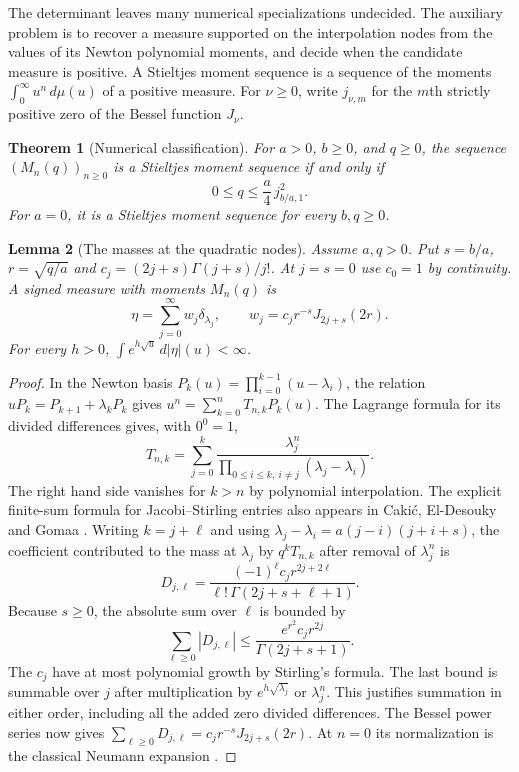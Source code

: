 \documentclass[11pt]{article}
\theoremstyle{plain}\newtheorem{theorem}{Theorem}[section]\newtheorem{lemma}[theorem]{Lemma}\newtheorem{corollary}[theorem]{Corollary}\newtheorem{proposition}[theorem]{Proposition}
\numberwithin{equation}{section}
\begin{document}
The determinant leaves many numerical specializations undecided.
The auxiliary problem is to recover a measure supported on the
interpolation nodes from the values of its Newton polynomial moments,
and decide when the candidate measure is positive.
A Stieltjes moment sequence is a sequence of the moments
$\int_0^\infty u^n\,d\mu(u)$ of a positive measure.
For $\nu\geq0$, write $j_{\nu,m}$ for the $m$th strictly positive
zero of the Bessel function $J_\nu$.

\begin{theorem}[Numerical classification]\label{thm:js-range}
For $a>0$, $b\geq0$, and $q\geq0$, the sequence $(M_n(q))_{n\geq0}$ is
a Stieltjes moment sequence if and only if
\[
      0\leq q\leq \frac a4\,j_{b/a,1}^2.
\]
For $a=0$, it is a Stieltjes moment sequence for every $b,q\geq0$.
\end{theorem}

\begin{lemma}[The masses at the quadratic nodes]\label{lem:js-masses}
Assume $a,q>0$. Put $s=b/a$, $r=\sqrt{q/a}$ and
$c_j=(2j+s)\Gamma(j+s)/j!$.
At $j=s=0$ use $c_0=1$ by continuity.
A signed measure with moments $M_n(q)$ is
\[
     \eta=\sum_{j=0}^\infty w_j\delta_{\lambda_j},
     \qquad w_j=c_jr^{-s}J_{2j+s}(2r).
\]
For every $h>0$, $\int e^{h\sqrt{u}}\,d|\eta|(u)<\infty$.
\end{lemma}
\begin{proof}
In the Newton basis $P_k(u)=\prod_{i=0}^{k-1}(u-\lambda_i)$,
the relation $uP_k=P_{k+1}+\lambda_kP_k$ gives
$u^n=\sum_{k=0}^n T_{n,k}P_k(u)$. The Lagrange formula for its
divided differences gives, with $0^0=1$,
\[
 T_{n,k}=\sum_{j=0}^k
   \frac{\lambda_j^n}{\prod_{0\leq i\leq k,\ i\ne j}(\lambda_j-\lambda_i)} .
\]
The right hand side vanishes for $k>n$ by polynomial interpolation.
The explicit finite-sum formula for Jacobi--Stirling entries also
appears in Caki\'c, El-Desouky and Gomaa \cite{cakic}.
Writing $k=j+\ell$ and using
$\lambda_j-\lambda_i=a(j-i)(j+i+s)$, the coefficient contributed
to the mass at $\lambda_j$ by $q^kT_{n,k}$ after removal of $\lambda_j^n$ is
\[
     D_{j,\ell}=
     \frac{(-1)^\ell c_jr^{2j+2\ell}}{\ell!\,\Gamma(2j+s+\ell+1)} .
\]
Because $s\geq0$, the absolute sum over $\ell$ is bounded by
\[
 \sum_{\ell\geq0}|D_{j,\ell}|
 \leq \frac{e^{r^2} c_jr^{2j}}{\Gamma(2j+s+1)}.
\]
The $c_j$ have at most polynomial growth by Stirling's formula.
The last bound is summable over $j$ after multiplication by
$e^{h\sqrt{\lambda_j}}$ or $\lambda_j^n$. This justifies summation
in either order, including all the added zero divided differences.
The Bessel power series \cite[10.2.2]{dlmf} now gives
$\sum_{\ell\geq0}D_{j,\ell}=c_jr^{-s}J_{2j+s}(2r)$.
At $n=0$ its normalization is the classical Neumann expansion
\cite[10.23.15]{dlmf}.
\end{proof}
\end{document}
